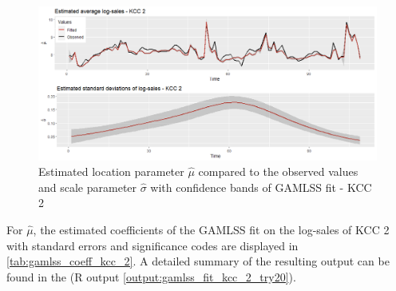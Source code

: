 \begin{figure}[H]
\centering
  \includegraphics[width=0.95\linewidth]{figures/gamlss_kcc_2_estimated_parameters.png}
  \caption{Estimated location parameter $\hat{\mu}$ compared to the observed values and scale parameter $\hat{\sigma}$ with confidence bands of GAMLSS fit - KCC 2}
  \label{fig:gamlss_kcc_2_estimated_parameters}
\end{figure}










For $\hat{\mu}$, the estimated coefficients of the \ac{GAMLSS} fit on the log-sales of \ac{KCC} 2 with standard errors and significance codes are displayed in \autoref{tab:gamlss_coeff_kcc_2}. A detailed summary of the resulting output can be found in the  (R output \ref{output:gamlss_fit_kcc_2_try20}).
\\


